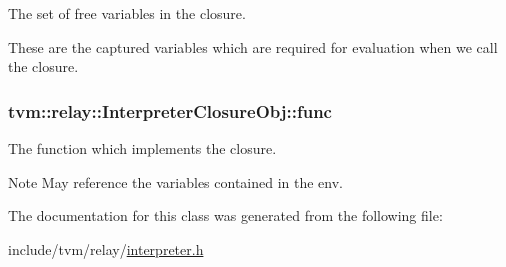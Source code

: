 The set of free variables in the closure. 

These are the captured variables which are required for evaluation when we call the closure. 
\subsubsection[{\texorpdfstring{func}{func}}]{ tvm\+::relay\+::\+Interpreter\+Closure\+Obj\+::func}\hypertarget{classtvm_1_1relay_1_1InterpreterClosureObj_a698f143669d058321f53cb31a08982cd}{}\label{classtvm_1_1relay_1_1InterpreterClosureObj_a698f143669d058321f53cb31a08982cd}


The function which implements the closure. 

\begin{DoxyNote}{Note}
May reference the variables contained in the env. 
\end{DoxyNote}


The documentation for this class was generated from the following file\+:\begin{DoxyCompactItemize}
\item 
include/tvm/relay/\hyperlink{interpreter_8h}{interpreter.\+h}\end{DoxyCompactItemize}
